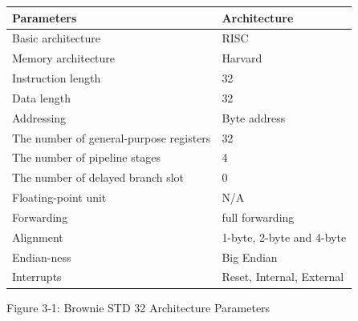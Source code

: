 \documentclass[
]{article}
\begin{document}
\begin{longtable}[]{@{}ll@{}}
\toprule
\textbf{Parameters} & \textbf{Architecture}\tabularnewline
\midrule
\endhead
Basic architecture & RISC\tabularnewline
Memory architecture & Harvard\tabularnewline
Instruction length & 32\tabularnewline
Data length & 32\tabularnewline
Addressing & Byte address\tabularnewline
The number of general-purpose registers & 32\tabularnewline
The number of pipeline stages & 4\tabularnewline
The number of delayed branch slot & 0\tabularnewline
Floating-point unit & N/A\tabularnewline
Forwarding & full forwarding\tabularnewline
Alignment & 1-byte, 2-byte and 4-byte\tabularnewline
Endian-ness & Big Endian\tabularnewline
Interrupts & Reset, Internal, External\tabularnewline
\bottomrule
\end{longtable}

Figure 3‑1: Brownie STD 32 Architecture Parameters
\end{document}
